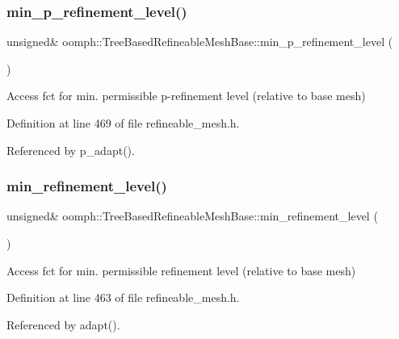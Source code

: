 \subsubsection{\texorpdfstring{min\+\_\+p\+\_\+refinement\+\_\+level()}{min\_p\_refinement\_level()}}
{\footnotesize\ttfamily unsigned\& oomph\+::\+Tree\+Based\+Refineable\+Mesh\+Base\+::min\+\_\+p\+\_\+refinement\+\_\+level (\begin{DoxyParamCaption}{ }\end{DoxyParamCaption})\hspace{0.3cm}{\ttfamily [inline]}}



Access fct for min. permissible p-\/refinement level (relative to base mesh) 



Definition at line 469 of file refineable\+\_\+mesh.\+h.



Referenced by p\+\_\+adapt().

\mbox{\label{classoomph_1_1TreeBasedRefineableMeshBase_af3974421171e1bb10daf6864f0749675}} 
\subsubsection{\texorpdfstring{min\+\_\+refinement\+\_\+level()}{min\_refinement\_level()}}
{\footnotesize\ttfamily unsigned\& oomph\+::\+Tree\+Based\+Refineable\+Mesh\+Base\+::min\+\_\+refinement\+\_\+level (\begin{DoxyParamCaption}{ }\end{DoxyParamCaption})\hspace{0.3cm}{\ttfamily [inline]}}



Access fct for min. permissible refinement level (relative to base mesh) 



Definition at line 463 of file refineable\+\_\+mesh.\+h.



Referenced by adapt().

\mbox{\label{classoomph_1_1TreeBasedRefineableMeshBase_a3f8fcf0452b612c6e8160d909af612fe}} 
